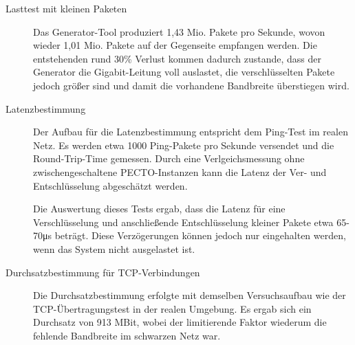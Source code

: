 \begin{description}
\item[Lasttest mit kleinen Paketen]
	Das Generator-Tool produziert 1,43 Mio. Pakete pro Sekunde, wovon wieder 1,01 Mio. Pakete auf der Gegenseite empfangen werden. 
	Die entstehenden rund 30\% Verlust kommen dadurch zustande, dass der Generator die Gigabit-Leitung voll auslastet, die verschlüsselten Pakete jedoch größer sind und damit die vorhandene Bandbreite überstiegen wird.

\item[Latenzbestimmung]
	Der Aufbau für die Latenzbestimmung entspricht dem Ping-Test im realen Netz.
	Es werden etwa 1000 Ping-Pakete pro Sekunde versendet und die Round-Trip-Time gemessen. 
	Durch eine Verlgeichsmessung ohne zwischengeschaltene PECTO-Instanzen kann die Latenz der Ver- und Entschlüsselung abgeschätzt werden.
	
	Die Auswertung dieses Tests ergab, dass die Latenz für eine Verschlüsselung und anschließende Entschlüsselung kleiner Pakete etwa 65-70\si{\micro\second} beträgt.
	Diese Verzögerungen können jedoch nur eingehalten werden, wenn das System nicht ausgelastet ist.

\item[Durchsatzbestimmung für TCP-Verbindungen]
	Die Durchsatzbestimmung erfolgte mit demselben Versuchsaufbau wie der TCP-Übertragungstest in der realen Umgebung. 
	Es ergab sich ein Durchsatz von 913 MBit, wobei der limitierende Faktor wiederum die fehlende Bandbreite im schwarzen Netz war.
	
\end{description}

  